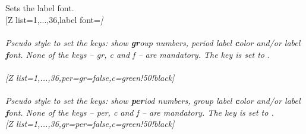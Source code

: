 \\ [10pt]\makebox[\linewidth][c]{\scalebox{.6}{\pgfPT[Z list={1,...,36},group label color=black]}}%
\\ [0pt]\pgfPTendoption%
\vfill%
\label{option_label font}%
%
{Sets the label font.}%
\\ [5pt][Z list={1,...,36},label font=\string\itshape]%
\\ [10pt]\makebox[\linewidth][c]{\scalebox{.6}{\pgfPT[Z list={1,...,36},label font=\itshape]}}%
\\ [0pt]\pgfPTendoption%
\vfill%
\label{style_per}%
%
{\textit{Pseudo style} to set the keys: show \textbf{gr}oup numbers, period label \textbf{c}olor and/or label \textbf{f}ont. None of the \textit{keys} -- gr, c and f -- are mandatory.
The key  is set to .
\\ [3pt]%
}%
\\ [5pt][Z list={1,...,36},per={gr=false,c=green!50!black}]%
\\ [10pt]\makebox[\linewidth][c]{\scalebox{.6}{\pgfPT[Z list={1,...,36},per={gr=false,c=green!50!black}]}}%
\\ [0pt]\pgfPTendstyle%
\vfill%
\label{style_gr}%
%
{\textit{Pseudo style} to set the keys: show \textbf{per}iod numbers, group label \textbf{c}olor and/or label \textbf{f}ont. None of the \textit{keys} -- per, c and f -- are mandatory.
The key  is set to .
\\ [3pt]%
}%
\vfill%
\newpage%
[Z list={1,...,36},gr={per=false,c=green!50!black}]%
\\ [10pt]\makebox[\linewidth][c]{\scalebox{.6}{\pgfPT[Z list={1,...,36},gr={per=false,c=green!50!black}]}}%

